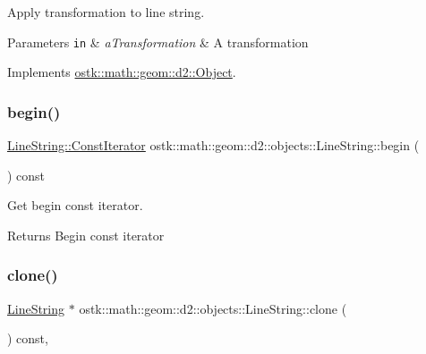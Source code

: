 Apply transformation to line string. 


\begin{DoxyParams}[1]{Parameters}
\mbox{\tt in}  & {\em a\+Transformation} & A transformation \\
\hline
\end{DoxyParams}


Implements \hyperlink{classostk_1_1math_1_1geom_1_1d2_1_1_object_a959e50211d7a680f7f904bbb752d75c9}{ostk\+::math\+::geom\+::d2\+::\+Object}.

\mbox{\label{classostk_1_1math_1_1geom_1_1d2_1_1objects_1_1_line_string_a67bd071017fdd15e96b8930d4e16aacd}} 
\subsubsection{\texorpdfstring{begin()}{begin()}}
{\footnotesize\ttfamily \hyperlink{classostk_1_1math_1_1geom_1_1d2_1_1objects_1_1_line_string_a29e6326c716bef2ec438534cfdc1e118}{Line\+String\+::\+Const\+Iterator} ostk\+::math\+::geom\+::d2\+::objects\+::\+Line\+String\+::begin (\begin{DoxyParamCaption}{ }\end{DoxyParamCaption}) const}



Get begin const iterator. 

\begin{DoxyReturn}{Returns}
Begin const iterator 
\end{DoxyReturn}
\mbox{\label{classostk_1_1math_1_1geom_1_1d2_1_1objects_1_1_line_string_abb5ac5e7e3e068c6597aab554e6a5e21}} 
\subsubsection{\texorpdfstring{clone()}{clone()}}
{\footnotesize\ttfamily \hyperlink{classostk_1_1math_1_1geom_1_1d2_1_1objects_1_1_line_string}{Line\+String} $\ast$ ostk\+::math\+::geom\+::d2\+::objects\+::\+Line\+String\+::clone (\begin{DoxyParamCaption}{ }\end{DoxyParamCaption}) const\hspace{0.3cm}{\ttfamily [override]}, {\ttfamily [virtual]}}



